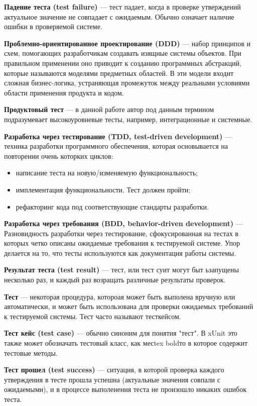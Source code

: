 {\bf Падение теста (test failure)} ---
тест падает, когда в проверке утверждений актуальное значение не совпадает с ожидаемым. Обычно означает наличие ошибки в проверяемой системе.

{\bf Проблемно-ориентированное проектирование (DDD)} --- набор принципов и схем, помогающих разработчикам создавать изящные системы объектов. При правильном применении оно приводит к созданию программных абстракций, которые называются моделями предметных областей. В эти модели входит сложная бизнес-логика, устраняющая промежуток между реальными условиями области применения продукта и кодом.

{\bf Продуктовый тест} --- в данной работе автор под данным термином подразумевает высокоуровневые тесты, например, интеграционные и системные.

{\bf Разработка через тестирование (TDD, test-driven development)} ---
техника разработки программного обеспечения, которая основывается на повторении очень которких циклов:

\begin{itemize}
\item написание теста на новую/изменяемую функциональность;
\item имплементация функциональности. Тест должен пройти;
\item рефакторинг кода под соответствующие стандарты разработки.
\end{itemize}

{\bf Разработка через требования (BDD, behavior-driven development)} ---
Разновидность разработки через тестирование, сфокусированная на тестах в которых четко описаны ожидаемые требования к тестируемой системе. Упор делается на то, что тесты используются как документация работы системы.

{\bf Результат теста (test result)} ---
тест, или тест суит могут быт ьзапущены несколько раз, и каждый раз возращать различные результаты проверок.

{\bf Тест} ---
некоторая процедура, котороая может быть выполена вручную или автоматически, и может быть использована для проверки ожидаемых требований к тестируемой системы. Тест часто называют тесткейсом.

{\bf Тест кейс (test case)} ---
обычно синоним для понятия "тест". В xUnit это также может обозначать тестовый класс, как месtex boldто в которое содержит тестовые методы.

{\bf Тест прошел (test success)} ---
ситуация, в которой проверка каждого утверждения в тесте прошла успешна (актуальные значения совпали с ожидаемыми), и в процессе выполенения теста не произошло никаких ошибок теста.

